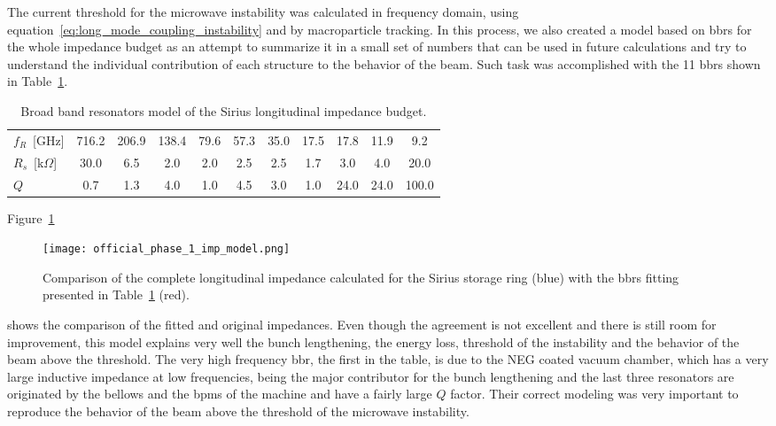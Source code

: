     The current threshold for the microwave instability was calculated in frequency domain, using equation~\eqref{eq:long_mode_coupling_instability} and by macroparticle tracking. In this process, we also created a model based on \glspl{bbr} for the whole impedance budget as an attempt to summarize it in a small set of numbers that can be used in future calculations and try to understand the individual contribution of each structure to the behavior of the beam. Such task was accomplished with the \num{11} \glspl{bbr} shown in Table~\ref{tab:resonator_model}.
    \begin{table}
        \centering
        \caption{Broad band resonators model of the Sirius longitudinal impedance budget.}
        \label{tab:resonator_model}
        \begin{tabular}{l *{10}{c}}
            \toprule
            $f_R$~[GHz]       & 716.2 & 206.9  & 138.4  &  79.6  &  57.3
            &  35.0 &  17.5  & 17.8   &  11.9  &   9.2 \\
            $R_s$~[k$\Omega$] & 30.0  &  6.5   &  2.0   &  2.0   &  2.5
            &  2.5  &  1.7   &  3.0   &  4.0   &  20.0 \\
            $Q$               &  0.7  &  1.3   &  4.0   &  1.0   &   4.5
            &  3.0  &  1.0   & 24.0   &  24.0  &  100.0 \\
            \bottomrule
        \end{tabular}
    \end{table}
    Figure~\ref{fig:ph1_imp_model_comp}
    \begin{figure}
        \centering
        \texttt{[image: official\_phase\_1\_imp\_model.png]}
        \caption[Fitting of the impedance budget of the storage ring.]{Comparison of the complete longitudinal impedance calculated for the Sirius storage ring (blue) with the \glspl{bbr} fitting presented in Table~\ref{tab:resonator_model} (red).}
        \label{fig:ph1_imp_model_comp}
    \end{figure}
    shows the comparison of the fitted and original impedances. Even though the agreement is not excellent and there is still room for improvement, this model explains very well the bunch lengthening, the energy loss, threshold of the instability and the behavior of the beam above the threshold. The very high frequency \gls{bbr}, the first in the table, is due to the NEG coated vacuum chamber, which has a very large inductive impedance at low frequencies, being the major contributor for the bunch lengthening and the last three resonators are originated by the bellows and the \glspl{bpm} of the machine and have a fairly large $Q$ factor. Their correct modeling was very important to reproduce the behavior of the beam above the threshold of the microwave instability.

